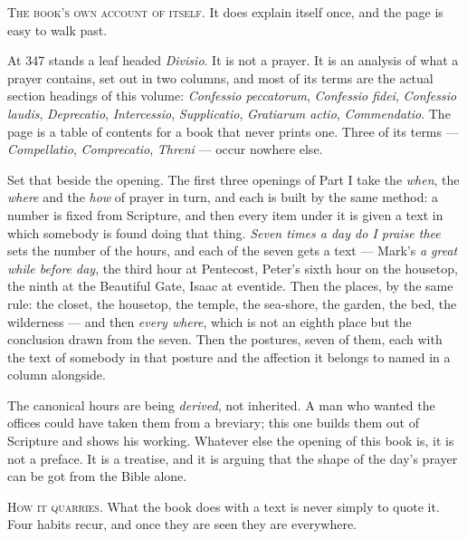 \vspace{0.8\baselineskip}
{\scshape The book's own account of itself.}\quad
It does explain itself once, and the page is easy to walk past.

At 347 stands a leaf headed \emph{Divisio}. It is not a prayer. It is an analysis
of what a prayer contains, set out in two columns, and most of its terms are the
actual section headings of this volume: \emph{Confessio peccatorum}, \emph{Confessio
fidei}, \emph{Confessio laudis}, \emph{Deprecatio}, \emph{Intercessio},
\emph{Supplicatio}, \emph{Gratiarum actio}, \emph{Commendatio}. The page is a table
of contents for a book that never prints one. Three of its terms ---
\emph{Compellatio}, \emph{Comprecatio}, \emph{Threni} --- occur nowhere else.

Set that beside the opening. The first three openings of Part I take the
\emph{when}, the \emph{where} and the \emph{how} of prayer in turn, and each is
built by the same method: a number is fixed from Scripture, and then every item
under it is given a text in which somebody is found doing that thing. \emph{Seven
times a day do I praise thee} sets the number of the hours, and each of the seven
gets a text --- Mark's \emph{a great while before day}, the third hour at
Pentecost, Peter's sixth hour on the housetop, the ninth at the Beautiful Gate,
Isaac at eventide. Then the places, by the same rule: the closet, the housetop,
the temple, the sea-shore, the garden, the bed, the wilderness --- and then
\emph{every where}, which is not an eighth place but the conclusion drawn from the
seven. Then the postures, seven of them, each with the text of somebody in that
posture and the affection it belongs to named in a column alongside.

The canonical hours are being \emph{derived}, not inherited. A man who wanted the
offices could have taken them from a breviary; this one builds them out of
Scripture and shows his working. Whatever else the opening of this book is, it is
not a preface. It is a treatise, and it is arguing that the shape of the day's
prayer can be got from the Bible alone.

\vspace{0.8\baselineskip}
{\scshape How it quarries.}\quad
What the book does with a text is never simply to quote it. Four habits recur, and
once they are seen they are everywhere.

